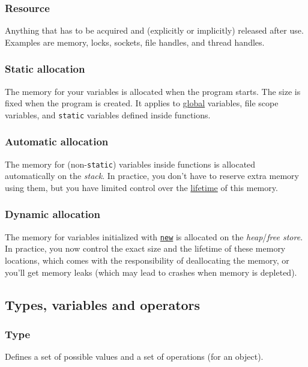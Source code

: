 \documentclass[table, xcdraw]{article}%
\begin{document}
\subsubsection{Resource} \label{resource}
Anything that has to be acquired and (explicitly or implicitly) released after use. Examples are memory, locks, sockets, file handles, and thread handles.

\subsubsection{Static allocation} \label{staticallocation}
The memory for your variables is allocated when the program starts. The size is fixed when the program is created. It applies to \hyperref[globalscope]{global} variables, file scope variables, and \texttt{static} variables defined inside functions.

\subsubsection{Automatic allocation} \label{automaticallocation}
The memory for (non-\texttt{static}) variables inside functions is allocated automatically on the \textit{stack}. In practice, you don't have to reserve extra memory using them, but you have limited control over the \hyperref[localscope]{lifetime} of this memory.

\subsubsection{Dynamic allocation} \label{dynamicallocation}
The memory for variables initialized with \hyperref[new]{\texttt{new}} is allocated on the \textit{heap}/\textit{free store}. In practice, you now control the exact size and the lifetime of these memory locations, which comes with the responsibility of deallocating the memory, or you'll get memory leaks (which may lead to crashes when memory is depleted).

\subsection{Types, variables and operators}

\subsubsection{Type}
Defines a set of possible values and a set of operations (for an object).
\end{document}
